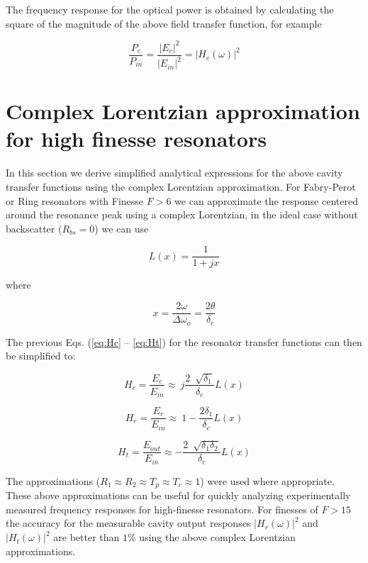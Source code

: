\documentclass[10pt]{article}
\begin{document}
\noindent The frequency response for the optical power is obtained by calculating the square of the magnitude of the above field transfer function, for example

\begin{equation} 
\frac{P_{c}}{P_{in}} = \frac{|E_{c}|^2}{|E_{in}|^2}  = |H_c(\omega)|^2
\end{equation}


\section{Complex Lorentzian approximation for high finesse resonators}

In this section we derive simplified analytical expressions for the above cavity transfer functions using the complex Lorentzian approximation.  For Fabry-Perot or Ring resonators with Finesse $F>6$ we can approximate the response centered around the resonance peak using a complex Lorentzian, in the ideal case without backscatter ($R_{bs} = 0$) we can use

\begin{equation}
L(x)  = \frac{1}{1+jx}
\label{eq:Lx}
\end{equation}

\noindent  where

\begin{equation}
x = \frac{2\omega}{\Delta \omega_o} = \frac{2\theta}{\delta_c}
\end{equation}

\noindent  The previous Eqs. (\ref{eq:Hc} -- \ref{eq:Ht}) for the resonator transfer functions can then be simplified to: 

\begin{equation}
H_c = \frac{E_{c}}{E_{in}}  \approx ~ j \frac{ 2~ \sqrt[]{\delta_1}}{\delta_c}  L(x)
\end{equation}

\begin{equation}
H_r = \frac{E_r}{E_{in}} \approx ~ 1 -\frac{2\delta_1}{\delta_c} L(x) 
\label{eq:Hra}
\end{equation}

\begin{equation}
H_t = \frac{E_{out}}{E_{in}} \approx  - \frac{ 2~ \sqrt[]{\delta_1 \delta_2}}{\delta_c}  L(x)
\end{equation}  


\noindent  The approximations ($ R_1 \approx R_2 \approx T_p \approx T_c \approx 1 $) were used where appropriate.
These above approximations can be useful for quickly analyzing experimentally measured frequency responses for high-finesse resonators.
For finesses of $F>15$ the accuracy for the measurable cavity output responses $|H_r(\omega)|^2$ and  $|H_t(\omega)|^2$ are better than $1\%$ using the above complex Lorentzian approximations.  
\end{document}
